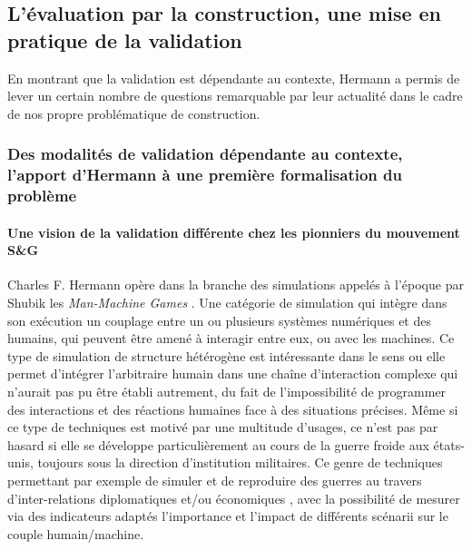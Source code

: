
\subsection{L'évaluation par la construction, une mise en pratique de la validation}
\label{sssec:position_hermann}


En montrant que la validation est dépendante au contexte, Hermann a permis de lever un certain nombre de questions remarquable par leur actualité dans le cadre de nos propre problématique de construction.  %

\subsubsection{Des modalités de validation dépendante au contexte, l'apport d'Hermann à une première formalisation du problème}

\paragraph{Une vision de la validation différente chez les pionniers du mouvement S\&G}

Charles F. Hermann opère dans la branche des simulations appelés à l'époque par Shubik les \textit{Man-Machine Games} \autocite{Shubik1972}. Une catégorie de simulation qui intègre dans son exécution un couplage entre un ou plusieurs systèmes numériques et des humains, qui peuvent être amené à interagir entre eux, ou avec les machines. Ce type de simulation de structure hétérogène est intéressante dans le sens ou elle permet d'intégrer l'arbitraire humain dans une chaîne d'interaction complexe qui n'aurait pas pu être établi autrement, du fait de l'impossibilité de programmer des interactions et des réactions humaines face à des situations précises. Même si ce type de techniques est motivé par une multitude d'usages, ce n'est pas par hasard si elle se développe particulièrement au cours de la guerre froide aux états-unis, toujours sous la direction d'institution militaires. Ce genre de techniques permettant par exemple de simuler et de reproduire des guerres au travers d'inter-relations diplomatiques et/ou économiques \autocite{Hermann1967b}, avec la possibilité de mesurer via des indicateurs adaptés l'importance et l'impact de différents scénarii sur le couple humain/machine.

